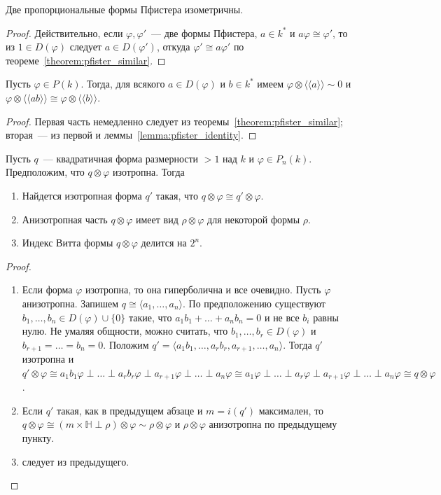 \documentclass[a4paper,oneside,12pt]{article}
\theoremstyle{plain} { \swapnumbers
\newtheorem{theorem}{Теорема}[subsection]
\newtheorem{corollary}[theorem]{Следствие}
\newtheorem{lemma}[theorem]{Лемма}
\newtheorem{proposition}[theorem]{Утверждение}
\newtheorem{claim}[theorem]{Факт}
}
\theoremstyle{definition} { \swapnumbers
\newtheorem{definition}[theorem]{Определение}
\newtheorem{notation}[theorem]{Обозначение}
\newtheorem{remark}[theorem]{Замечание}
\newtheorem{remarks}[theorem]{Замечания}
\newtheorem{example}[theorem]{Пример}
\newtheorem{examples}[theorem]{Примеры}
\newtheorem{sssection}[theorem]{}
}
\def\ph{\varphi}
\def\la{\langle}
\def\ra{\rangle}
\def\lla{\la\!\la}
\def\rra{\ra\!\ra}
\begin{document}
\begin{corollary}
Две пропорциональные формы Пфистера изометричны.
\end{corollary}
\begin{proof}
Действительно, если $\ph,\ph'$~--- две формы Пфистера, $a\in k^*$ и $a\ph\cong\ph'$, то
из $1\in D(\ph)$ следует $a\in D(\ph')$, откуда $\ph'\cong a\ph'$ по теореме~\ref{theorem:pfister_similar}.
\end{proof}

\begin{corollary}\label{corr:pfister_isotrop}
Пусть $\ph\in P(k)$. Тогда, для всякого $a\in D(\ph)$ и $b\in k^*$ имеем $\ph\otimes\lla a\rra\sim 0$ и
$\ph\otimes\lla ab\rra\cong\ph\otimes\lla b\rra$.
\end{corollary}
\begin{proof}
Первая часть немедленно следует из теоремы~\ref{theorem:pfister_similar}; вторая~--- из первой и
леммы~\ref{lemma:pfister_identity}.
\end{proof}

\begin{corollary}
Пусть $q$~--- квадратичная форма размерности $>1$ над $k$ и $\ph\in P_n(k)$. Предположим, что $q\otimes\ph$ изотропна. Тогда
\begin{enumerate}
\item Найдется изотропная форма $q'$ такая, что $q\otimes\ph\cong q'\otimes\ph$.
\item Анизотропная часть $q\otimes\ph$ имеет вид $\rho\otimes\ph$ для некоторой формы $\rho$.
\item Индекс Витта формы $q\otimes\ph$ делится на $2^n$.
\end{enumerate}
\end{corollary}
\begin{proof}
\begin{enumerate}
\item
Если форма $\ph$ изотропна, то она гиперболична и все очевидно. Пусть $\ph$ анизотропна. Запишем
$q\cong\la a_1,\dots,a_n\ra$. По предположению существуют $b_1,\dots,b_n\in D(\ph)\cup\{0\}$ такие,
что $a_1b_1+\dots+a_nb_n=0$ и не все $b_i$ равны нулю. Не умаляя общности, можно считать, что
$b_1,\dots,b_r\in D(\ph)$ и $b_{r+1}=\dots=b_n=0$. Положим $q'=\la a_1b_1,\dots,a_rb_r,a_{r+1},\dots,a_n\ra$.
Тогда $q'$ изотропна и $q'\otimes\ph\cong a_1b_1\ph\perp\dots\perp a_rb_r\ph\perp a_{r+1}\ph\perp\dots\perp a_n\ph
\cong a_1\ph\perp\dots\perp a_r\ph\perp a_{r+1}\ph\perp\dots\perp a_n\ph\cong q\otimes\ph$.
\item Если $q'$ такая, как в предыдущем абзаце и $m=i(q')$ максимален, то
$q\otimes\ph\cong (m\times\mathbb H\perp\rho)\otimes\ph\sim\rho\otimes\ph$ и $\rho\otimes\ph$
анизотропна по предыдущему пункту.
\item следует из предыдущего.
\end{enumerate}
\end{proof}
\end{document}
